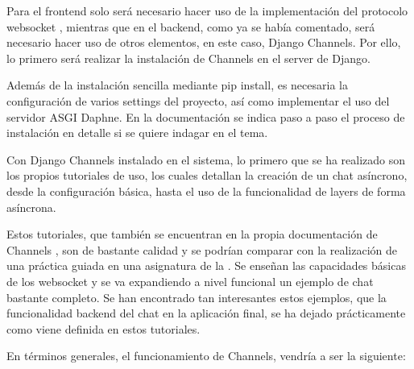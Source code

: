 Para el frontend solo será necesario hacer uso de la implementación del protocolo websocket \cite{websocketMDN}, mientras que en el 
backend, como ya se había comentado, será necesario hacer uso de otros elementos, en este caso, Django Channels. 
Por ello, lo primero será realizar la instalación de Channels en el server de Django.

Además de la instalación sencilla mediante pip install, es necesaria la configuración de varios settings del proyecto, así
como implementar el uso del servidor ASGI Daphne. En la documentación \cite{djangoChannelsInstall} se indica paso a paso el proceso 
de instalación en detalle si se quiere indagar en el tema.

Con Django Channels instalado en el sistema, lo primero que se ha realizado son los propios tutoriales de uso, los cuales detallan 
la creación de un chat asíncrono, desde la configuración básica, hasta el uso de la funcionalidad de layers de forma asíncrona.

Estos tutoriales, que también se encuentran en la propia documentación de Channels \cite{djangoChannelsTutorial}, son 
de bastante calidad y se podrían comparar con la realización de una práctica guiada en una asignatura de la 
\escuelalargo. Se enseñan las capacidades básicas de los websocket y se va expandiendo a nivel funcional un ejemplo
de chat bastante completo. Se han encontrado tan interesantes estos ejemplos, que la funcionalidad backend del chat 
en la aplicación final, se ha dejado prácticamente como viene definida en estos tutoriales.

En términos generales, el funcionamiento de Channels, vendría a ser la siguiente:

